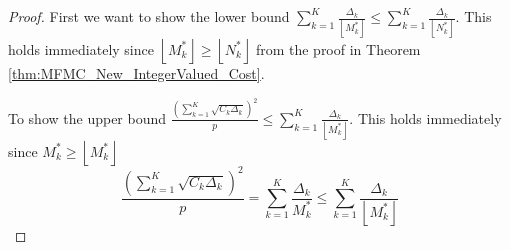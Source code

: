 \begin{proof}
First we want to show the lower bound $\sum_{k=1}^K \frac{\Delta_k}{\left\lfloor M_k^* \right\rfloor}\le \sum_{k=1}^K \frac{\Delta_k}{\left\lfloor N_k^* \right\rfloor}$. This holds immediately since  $\left\lfloor M_k^* \right\rfloor \ge \left\lfloor N_k^* \right\rfloor$ from the proof in Theorem \ref{thm:MFMC_New_IntegerValued_Cost}.

To show the upper bound $\frac{\left(\sum_{k=1}^K\sqrt{C_k\Delta_k}\right)^2}{p}\le \sum_{k=1}^K \frac{\Delta_k}{\left\lfloor M_k^* \right\rfloor}$. This holds immediately since $M_k^* \ge \left\lfloor M_k^* \right\rfloor$
\[
\frac{\left(\sum_{k=1}^K\sqrt{C_k\Delta_k}\right)^2}{p} = \sum_{k=1}^K\frac{\Delta_k}{ M_k^* }\le \sum_{k=1}^K\frac{\Delta_k}{\left\lfloor M_k^* \right\rfloor}
\]


\end{proof}
